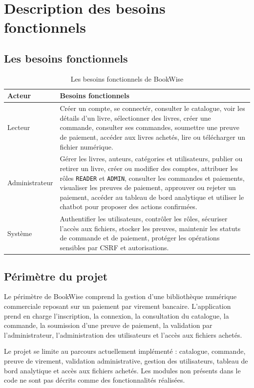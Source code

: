 \documentclass[12pt,a4paper]{report}
\begin{document}
\newpage
\section{Description des besoins fonctionnels}

\subsection{Les besoins fonctionnels}

\begin{longtable}{|p{3.2cm}|p{10.4cm}|}
    \caption{Les besoins fonctionnels de BookWise}\\
    \hline
    \textbf{Acteur} & \textbf{Besoins fonctionnels}\\
    \hline
    Lecteur & Créer un compte, se connectér, consulter le catalogue, voir les détails d'un livre, sélectionner des livres, créer une commande, consulter ses commandes, soumettre une preuve de paiement, accéder aux livres achetés, lire ou télécharger un fichier numérique.\\
    \hline
    Administrateur & Gérer les livres, auteurs, catégories et utilisateurs, publier ou retirer un livre, créer ou modifier des comptes, attribuer les rôles \texttt{READER} et \texttt{ADMIN}, consulter les commandes et paiements, visualiser les preuves de paiement, approuver ou rejeter un paiement, accéder au tableau de bord analytique et utiliser le chatbot pour proposer des actions confirmées.\\
    \hline
    Système & Authentifier les utilisateurs, contrôler les rôles, sécuriser l'accès aux fichiers, stocker les preuves, maintenir les statuts de commande et de paiement, protéger les opérations sensibles par CSRF et autorisations.\\
    \hline
\end{longtable}

\subsection{Périmètre du projet}

Le périmètre de BookWise comprend la gestion d'une bibliothèque numérique commerciale reposant sur un paiement par virement bancaire. L'application prend en charge l'inscription, la connexion, la consultation du catalogue, la commande, la soumission d'une preuve de paiement, la validation par l'administrateur, l'administration des utilisateurs et l'accès aux fichiers achetés.

Le projet se limite au parcours actuellement implémenté : catalogue, commande, preuve de virement, validation administrative, gestion des utilisateurs, tableau de bord analytique et accès aux fichiers achetés. Les modules non présents dans le code ne sont pas décrits comme des fonctionnalités réalisées.
\end{document}
